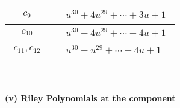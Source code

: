 \documentclass[1p]{elsarticle_modified}
\theoremstyle{definition}
\begin{document}
\begin{tabular}{m{50pt}|m{274pt}}
\hline $$\begin{aligned}c_{9}\end{aligned}$$&$\begin{aligned}
&u^{30}+4 u^{29}+\cdots+3 u+1
\end{aligned}$\\
\hline $$\begin{aligned}c_{10}\end{aligned}$$&$\begin{aligned}
&u^{30}-4 u^{29}+\cdots-4 u+1
\end{aligned}$\\
\hline $$\begin{aligned}c_{11},c_{12}\end{aligned}$$&$\begin{aligned}
&u^{30}- u^{29}+\cdots-4 u+1
\end{aligned}$\\
\hline
\end{tabular}\\~\\
\newpage\renewcommand{\arraystretch}{1}
\flushleft \textbf{(v) Riley Polynomials at the component}\newline \\
\end{document}
